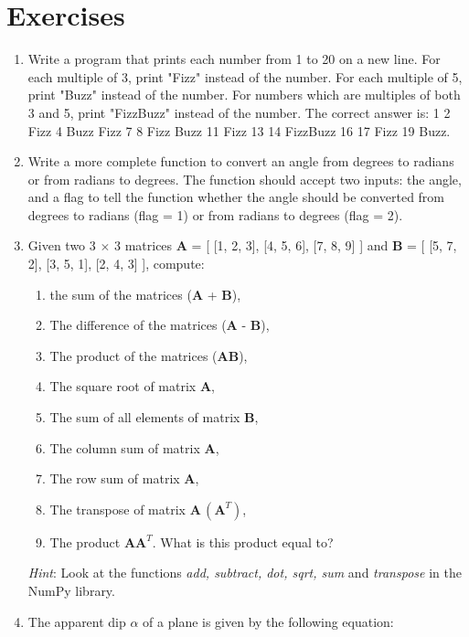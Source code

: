 \documentclass[a4paper , 12pt]{book}
\begin{document}
\section{Exercises}

\begin{enumerate}
    \item Write a program that prints each number from 1 to 20 on a new line. For each multiple of 3, print "Fizz" instead of the number. For each multiple of 5, print "Buzz" instead of the number. For numbers which are multiples of both 3 and 5, print "FizzBuzz" instead of the number. The correct answer is: 1 2 Fizz 4 Buzz Fizz 7 8 Fizz Buzz 11 Fizz 13 14 FizzBuzz 16 17 Fizz 19 Buzz.
    
    \item Write a more complete function to convert an angle from degrees to radians or from radians to degrees. The function should accept two inputs: the angle, and a flag to tell the function whether the angle should be converted from degrees to radians (flag = 1) or from radians to degrees (flag = 2).
    
    \item Given two 3 $\times$ 3 matrices \textbf{A} = [ [1, 2, 3], [4, 5, 6], [7, 8, 9] ] and \textbf{B} = [ [5, 7, 2], [3, 5, 1], [2, 4, 3] ], compute: 
    \begin{enumerate}
    \item  the sum of the matrices (\textbf{A} + \textbf{B}), 
    \item  The difference of the matrices (\textbf{A} - \textbf{B}), 
    \item  The product of the matrices (\textbf{AB}), 
    \item  The square root of matrix \textbf{A}, 
    \item  The sum of all elements of matrix \textbf{B}, 
    \item  The column sum of matrix \textbf{A}, 
    \item  The row sum of matrix \textbf{A}, 
    \item  The transpose of matrix $\textbf{A}\, (\textbf{A}^T)$, 
    \item  The product $\textbf{AA}^T$. What is this product equal to?
    \end{enumerate} 
    
    \textit{Hint}: Look at the functions \textit{add, subtract, dot, sqrt, sum} and \textit{transpose} in the NumPy library. 
    
    \item The apparent dip $\alpha$ of a plane is given by the following equation:
    

\end{enumerate}
\end{document}
